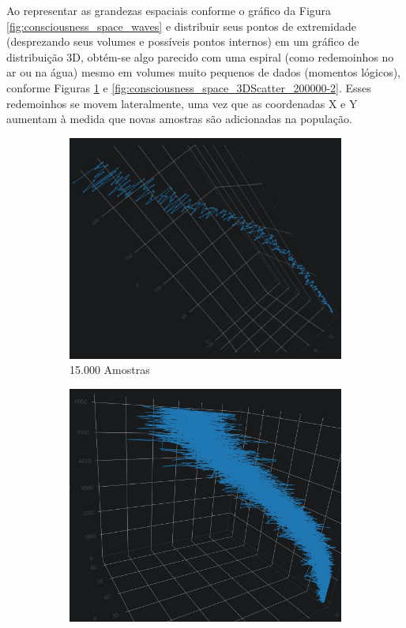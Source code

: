 Ao representar as grandezas espaciais conforme o gráfico da Figura \ref{fig:consciousness_space_waves} e distribuir seus pontos de extremidade (desprezando seus volumes e possíveis pontos internos) em um gráfico de distribuição 3D, obtém-se algo parecido com uma espiral (como redemoinhos no ar ou na água) mesmo em volumes muito pequenos de dados (momentos lógicos), conforme Figuras \ref{fig:consciousness_space_3DScatter15000-10} e \ref{fig:consciousness_space_3DScatter_200000-2}. Esses redemoinhos se movem lateralmente, uma vez que as coordenadas X e Y aumentam à medida que novas amostras são adicionadas na população. 
\begin{figure}[H]
\centering
	\begin{subfigure}[H]{0.47\linewidth}
	\centering
	\includegraphics[width=.96\linewidth]{sections/images/consciousness_space_3DScatter15000-10.jpg}
	\caption{15.000 Amostras}
	\label{fig:consciousness_space_3DScatter15000-10}
	\end{subfigure}
\hfill
	\begin{subfigure}[H]{0.47\linewidth}
	\centering
	\includegraphics[width=.9\linewidth]{sections/images/consciousness_space_3DScatter_200000-2.jpg}

\end{subfigure}
\end{figure}
